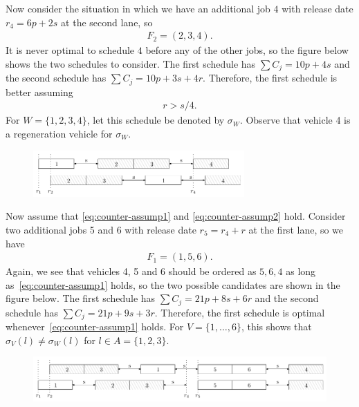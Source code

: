 \documentclass{article}
\theoremstyle{definition}
\theoremstyle{plain}
\begin{document}
Now consider the situation in which we have an additional job $4$ with release
date $r_{4} = 6p + 2s$ at the second lane, so
\begin{align*}
  F_{2} = (2,3,4) .
\end{align*}
It is never optimal to schedule $4$ before any of the other jobs, so the figure
below shows the two schedules to consider. The first schedule has
$\sum C_{j} = 10p + 4s$ and the second schedule has
$\sum C_{j} = 10p + 3s + 4r$. Therefore, the first schedule is better assuming
\begin{align}
  \label{eq:counter-assump2}
  r > s/4 .
\end{align}
For $W = \{1, 2, 3, 4\}$, let this schedule be denoted by $\sigma_{W}$.
Observe that vehicle 4 is a regeneration vehicle for $\sigma_{W}$.

\begin{figure}[h]
  \centering
  \includegraphics[width=0.72\textwidth]{figures/1234.pdf}
\end{figure}

Now assume that \eqref{eq:counter-assump1} and \eqref{eq:counter-assump2} hold.
Consider two additional jobs 5 and 6 with release date
$r_{5} = r_{4} + r$ at the first lane, so we have
\begin{align*}
  F_{1} = (1, 5, 6) .
\end{align*}
Again, we see that vehicles 4, 5 and 6 should be ordered as $5,6,4$ as long
as~\eqref{eq:counter-assump1} holds, so the two possible candidates are shown in
the figure below. The first schedule has $\sum C_{j} = 21p + 8s + 6r$ and the
second schedule has $\sum C_{j} = 21p + 9s + 3r$. Therefore, the first schedule
is optimal whenever~\eqref{eq:counter-assump1} holds. For
$V = \{ 1, \dots, 6\}$, this shows that $\sigma_{V}(l) \neq \sigma_{W}(l)$ for
$l \in A=\{1, 2, 3 \}$.

\begin{figure}[h]
  \centering
  \includegraphics[width=1.0\textwidth]{figures/123456.pdf}
\end{figure}




\end{document}
